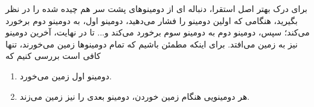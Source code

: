     برای درک بهتر اصل استقرا، دنباله ای از دومینوهای پشت سر هم چیده شده را در نظر بگیرید، 
    هنگامی که اولین دومینو را فشار می‌دهید، دومینو اول، به دومینو دوم برخورد می‌کند؛ سپس، دومینو
    دوم به دومینو سوم برخورد می‌کند و... تا در نهایت، آخرین دومینو نیز به زمین می‌افتد.
    برای اینکه مطمئن باشیم که تمام دومینوها زمین می‌خورند، تنها کافی است بررسی کنیم که 
    \begin{enumerate}
        \item دومینو اول زمین می‌خورد.
                
        \item هر دومینویی هنگام زمین خوردن، دومینو بعدی را نیز زمین می‌زند.
    \end{enumerate} 

